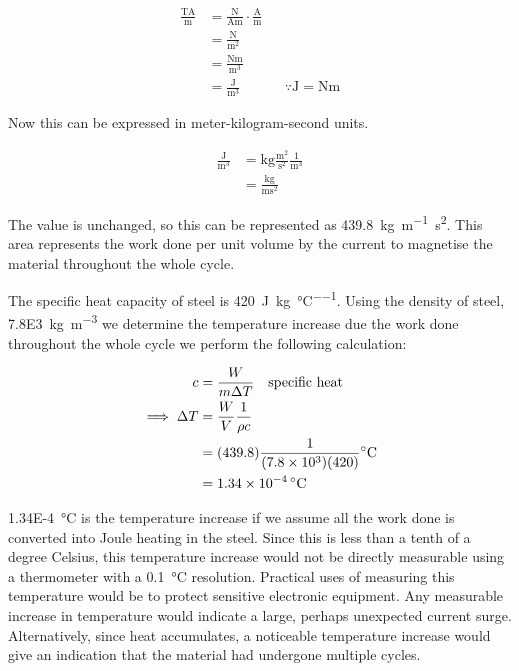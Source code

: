\begin{align*}
    \frac{\unit{\tesla\ampere}}{\unit{\meter}}
      &= \frac{\unit{\newton}}{\unit{\ampere\meter}}
         \cdot \frac{\unit{\ampere}}{\unit{\meter}} \\
      &= \frac{\unit{\newton}}{\unit{\meter\squared}} \\
      &= \frac{\unit{\newton\meter}}{\unit{\meter\cubed}} \\
      &= \frac{\unit{\joule}}{\unit{\meter\cubed}}
         && \because \unit{\joule} = \unit{\newton\meter}
\end{align*}


Now this can be expressed in meter-kilogram-second units.

\begin{align*}
    \frac{\unit{\joule}}{\unit{\meter}^3} &= \unit{\kilogram} \frac{\unit{\meter}^2}{\unit{\second}^2}
    \frac{1}{\unit{\meter}^3} \\
    &= \frac{\unit{\kilogram}}{\unit{\meter\second^2}}
\end{align*}

The value is unchanged, so this can be represented as \qty{439.8}{\kilogram\per\meter\second^2}.
This area represents the work done per unit volume by the current to magnetise the material throughout the whole
cycle.

The specific heat capacity of steel is \qty{420}{\joule\per\kilogram\per\celsius}.
Using the density of steel, \qty{7.8E3}{\kilogram\per\meter^3} we determine the temperature increase due the work done
throughout the whole cycle we perform the following
calculation:

\begin{align*}
    c &= \frac{W}{m \Delta T} \quad \text{specific heat}\\
    \implies \Delta T &= \frac{W}{V} \frac{1}{\rho c} \\
    &= (439.8) \frac{1}{(\qty{7.8E3}{}) (420)} \unit{\celsius} \\
    &= \qty{1.34E-4}{\celsius}
\end{align*}

\qty{1.34E-4}{\celsius} is the temperature increase if we assume all the work done is converted into Joule heating in the steel.
Since this is less than a tenth of a degree Celsius, this temperature increase would not be directly measurable
using a thermometer with a \qty{0.1}{\celsius} resolution.
Practical uses of measuring this temperature would be to protect sensitive electronic equipment.
Any measurable increase in temperature would indicate a large, perhaps unexpected current surge.
Alternatively, since heat accumulates, a noticeable temperature increase would give an
indication that the material had undergone multiple cycles.

